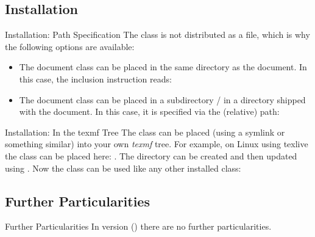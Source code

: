\documentclass{sopra-seraphim}
\begin{document}
    \subsection{Installation}
    \begin{frame}[fragile]{Installation: Path Specification}
        The class is not distributed as a  file, which is why the
    following options are available:
\begin{itemize}
    \item The document class can be placed in the same directory as the document.
    In this case, the inclusion instruction reads:
    \item The document class can be placed in a subdirectory / in a
                directory shipped with the document. In
                this case, it is specified via the (relative) path:
\end{itemize}

    \end{frame}

    \begin{frame}[fragile]{Installation: In the texmf Tree}
        The class can be placed (using a symlink or something similar)
        into your own \emph{texmf} tree.
        For example, on Linux using texlive
        the class can be placed here: .
        The directory can be created and then updated using
        . Now
        the class can be used like any other installed class:
    \end{frame}

    \subsection{Further Particularities}
    \begin{frame}[fragile]{Further Particularities}
        In version \thesosversion{} () there are no further particularities.
    \end{frame}
\end{document}
